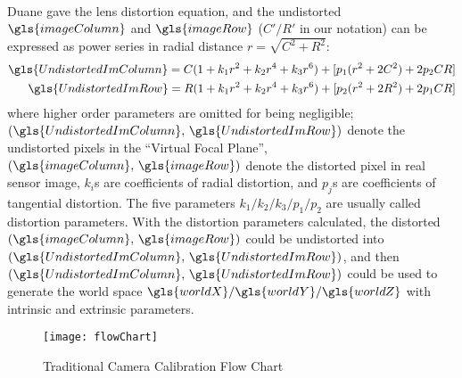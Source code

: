 \\\indent%
Duane \cite{distortion2_1966} gave the lens distortion equation, and the undistorted \(\gls{imageColumn}\) and \(\gls{imageRow}\) (\(C'/R'\) in our notation) can be expressed as power series in radial distance \(r = \sqrt{C^2 + R^2}\):
%
\begin{equation}
\begin{aligned}
\gls{UndistortedImColumn} =  C (1 + k_1 r^2 + k_2 r^4 + k_3 r^6) + [p_1 (r^2 + 2 C^2) + 2 p_2 CR] %
\\
\gls{UndistortedImRow} =  R (1 + k_1 r^2 + k_2 r^4 + k_3 r^6) + [p_2 (r^2 + 2 R^2) + 2 p_1 CR]
\end{aligned}
\label{lensDistortion}
\end{equation}%
%
\noindent
where higher order parameters are omitted for being negligible; \((\gls{UndistortedImColumn} , \, \gls{UndistortedImRow})\) denote the undistorted pixels in the \enquote{Virtual Focal Plane}, \((\gls{imageColumn}, \, \gls{imageRow} )\) denote the distorted pixel in real sensor image, \(k_i\)s are coefficients of radial distortion, and \(p_j\)s are coefficients of tangential distortion. The five parameters \(k_1/k_2/k_3/p_1/p_2\) are usually called distortion parameters. With the distortion parameters calculated, the distorted \((\gls{imageColumn}, \, \gls{imageRow} )\) could be undistorted into \((\gls{UndistortedImColumn} , \, \gls{UndistortedImRow})\), and then \((\gls{UndistortedImColumn} , \, \gls{UndistortedImRow})\) could be used to generate the world space \(\gls{worldX}/\gls{worldY}/\gls{worldZ}\) with intrinsic and extrinsic parameters.
%
\indent 
\begin{figure}[t]
\centering
\texttt{[image: flowChart]}
\caption{Traditional Camera Calibration Flow Chart}
\label{flowChart}
\end{figure}%
\\\indent
